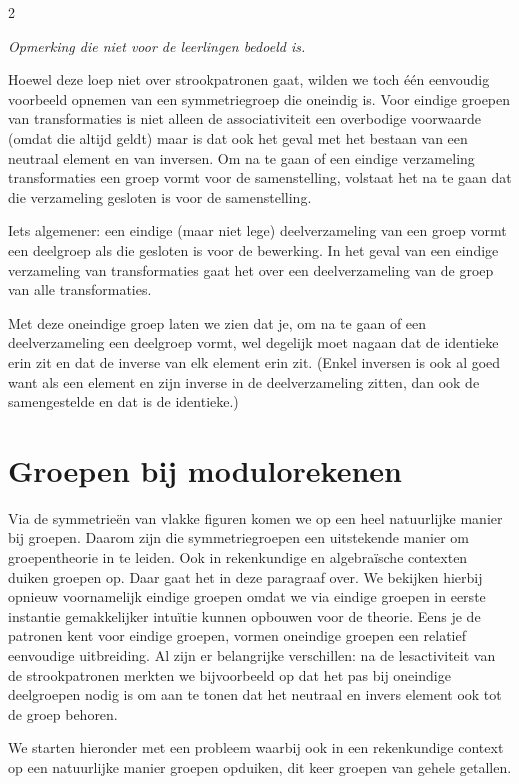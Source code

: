 \begin{multicols}{2}	
		
\emph{Opmerking die niet voor de leerlingen bedoeld is.} 
    
    Hoewel deze loep niet over strookpatronen gaat, wilden we toch één eenvoudig voorbeeld opnemen van een symmetriegroep die oneindig is. Voor eindige groepen van transformaties is niet alleen de associativiteit een overbodige voorwaarde (omdat die altijd geldt) maar is dat ook het geval met het bestaan van een neutraal element en van inversen. Om na te gaan of een eindige verzameling transformaties een groep vormt voor de samenstelling, volstaat het na te gaan dat die verzameling gesloten is voor de samenstelling. 
    
    Iets algemener: een eindige (maar niet lege) deelverzameling van een groep vormt een deelgroep als die gesloten is voor de bewerking. In het geval van een eindige verzameling van transformaties gaat het over een deelverzameling van de groep van alle transformaties.
    
    Met deze oneindige groep laten we zien dat je, om na te gaan of een deelverzameling een deelgroep vormt, wel degelijk moet nagaan dat de identieke erin zit en dat de inverse van elk element erin zit. (Enkel inversen is ook al goed want als een element en zijn inverse in de deelverzameling zitten, dan ook de samengestelde en dat is de identieke.)

\section{Groepen bij modulorekenen}
	
	Via de symmetrieën van vlakke figuren komen we op een heel natuurlijke manier bij groepen. Daarom zijn die symmetriegroepen een uitstekende manier om groepentheorie in te leiden. Ook in rekenkundige en algebraïsche contexten duiken groepen op. Daar gaat het in deze paragraaf over. We bekijken hierbij opnieuw voornamelijk eindige groepen omdat we via eindige groepen in eerste instantie gemakkelijker intuïtie kunnen opbouwen voor de theorie. Eens je de patronen kent voor eindige groepen, vormen oneindige groepen een relatief eenvoudige uitbreiding. Al zijn er belangrijke verschillen: na de lesactiviteit van de strookpatronen merkten we bijvoorbeeld op dat het pas bij oneindige deelgroepen nodig is om aan te tonen dat het neutraal en invers element ook tot de groep behoren.    
	
	We starten hieronder met een probleem waarbij ook in een rekenkundige context op een natuurlijke manier groepen opduiken, dit keer groepen van gehele getallen. 
	

\end{multicols}
